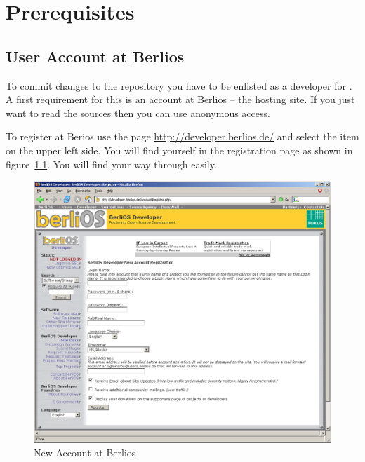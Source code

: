 \chapter{Prerequisites}


\section{User Account at Berlios}

To commit changes to the repository you have to be enlisted as a
developer for \ExTeX. A first requirement for this is an account at
Berlios -- the hosting site. If you just want to read the sources then
you can use anonymous access.

To register at Berios use the page \url{http://developer.berlios.de/}
and select the item \menu{} on the upper left side. You will find
yourself in the registration page as shown in
figure~\ref{fig:berlios-register}. You will find your way through
easily.
\begin{figure}[htbp]
  \centering  \includegraphics[scale=.33]{image/berlios-register}
  \caption{New Account at Berlios}\label{fig:berlios-register}
\end{figure}

